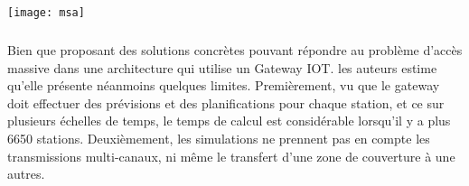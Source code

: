 \documentclass[12pt]{article}
\begin{document}
\texttt{[image: msa]}

\subparagraph{} Bien que proposant des solutions concrètes pouvant répondre au problème d'accès massive dans une architecture qui utilise un Gateway IOT.
les auteurs estime qu'elle présente néanmoins quelques limites. Premièrement,  vu que le gateway doit effectuer des prévisions et des planifications pour chaque station, et ce sur plusieurs échelles de temps, le temps de calcul est considérable lorsqu'il y a plus 6650 stations. Deuxièmement, les simulations ne prennent pas en compte les transmissions multi-canaux, ni même le transfert d'une zone de couverture à une autres.  
\end{document}
